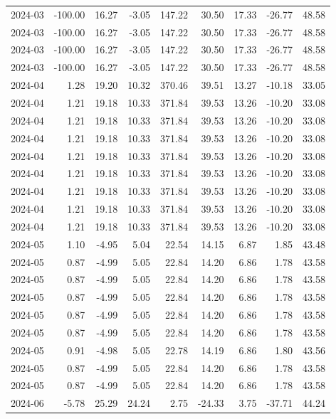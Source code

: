 \begin{table}[ht]
\begin{tabular}{lrrrrrrrr}
  2024-03 & -100.00 & 16.27 & -3.05 & 147.22 & 30.50 & 17.33 & -26.77 & 48.58 \\ 
  2024-03 & -100.00 & 16.27 & -3.05 & 147.22 & 30.50 & 17.33 & -26.77 & 48.58 \\ 
  2024-03 & -100.00 & 16.27 & -3.05 & 147.22 & 30.50 & 17.33 & -26.77 & 48.58 \\ 
  2024-03 & -100.00 & 16.27 & -3.05 & 147.22 & 30.50 & 17.33 & -26.77 & 48.58 \\ 
  2024-04 & 1.28 & 19.20 & 10.32 & 370.46 & 39.51 & 13.27 & -10.18 & 33.05 \\ 
  2024-04 & 1.21 & 19.18 & 10.33 & 371.84 & 39.53 & 13.26 & -10.20 & 33.08 \\ 
  2024-04 & 1.21 & 19.18 & 10.33 & 371.84 & 39.53 & 13.26 & -10.20 & 33.08 \\ 
  2024-04 & 1.21 & 19.18 & 10.33 & 371.84 & 39.53 & 13.26 & -10.20 & 33.08 \\ 
  2024-04 & 1.21 & 19.18 & 10.33 & 371.84 & 39.53 & 13.26 & -10.20 & 33.08 \\ 
  2024-04 & 1.21 & 19.18 & 10.33 & 371.84 & 39.53 & 13.26 & -10.20 & 33.08 \\ 
  2024-04 & 1.21 & 19.18 & 10.33 & 371.84 & 39.53 & 13.26 & -10.20 & 33.08 \\ 
  2024-04 & 1.21 & 19.18 & 10.33 & 371.84 & 39.53 & 13.26 & -10.20 & 33.08 \\ 
  2024-04 & 1.21 & 19.18 & 10.33 & 371.84 & 39.53 & 13.26 & -10.20 & 33.08 \\ 
  2024-05 & 1.10 & -4.95 & 5.04 & 22.54 & 14.15 & 6.87 & 1.85 & 43.48 \\ 
  2024-05 & 0.87 & -4.99 & 5.05 & 22.84 & 14.20 & 6.86 & 1.78 & 43.58 \\ 
  2024-05 & 0.87 & -4.99 & 5.05 & 22.84 & 14.20 & 6.86 & 1.78 & 43.58 \\ 
  2024-05 & 0.87 & -4.99 & 5.05 & 22.84 & 14.20 & 6.86 & 1.78 & 43.58 \\ 
  2024-05 & 0.87 & -4.99 & 5.05 & 22.84 & 14.20 & 6.86 & 1.78 & 43.58 \\ 
  2024-05 & 0.87 & -4.99 & 5.05 & 22.84 & 14.20 & 6.86 & 1.78 & 43.58 \\ 
  2024-05 & 0.91 & -4.98 & 5.05 & 22.78 & 14.19 & 6.86 & 1.80 & 43.56 \\ 
  2024-05 & 0.87 & -4.99 & 5.05 & 22.84 & 14.20 & 6.86 & 1.78 & 43.58 \\ 
  2024-05 & 0.87 & -4.99 & 5.05 & 22.84 & 14.20 & 6.86 & 1.78 & 43.58 \\ 
  2024-06 & -5.78 & 25.29 & 24.24 & 2.75 & -24.33 & 3.75 & -37.71 & 44.24 \\ 

\end{tabular}
\end{table}
